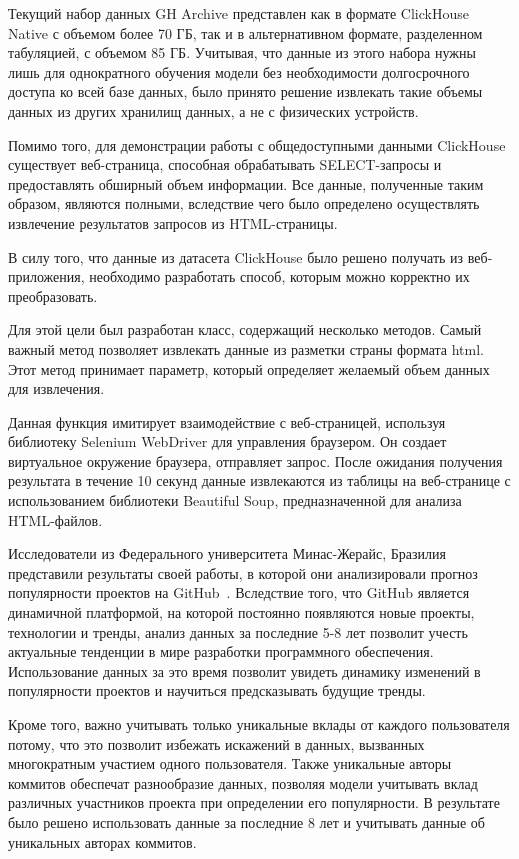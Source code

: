 Текущий набор данных GH Archive представлен как в формате ClickHouse Native с объемом более 70 ГБ, так и в альтернативном формате, разделенном табуляцией, с объемом 85 ГБ. Учитывая, что данные из этого набора нужны лишь для однократного обучения модели без необходимости долгосрочного доступа ко всей базе данных, было принято решение извлекать такие объемы данных из других хранилищ данных, а не с физических устройств.

Помимо того, для демонстрации работы с общедоступными данными ClickHouse существует веб-страница, способная обрабатывать SELECT-запросы и предоставлять обширный объем информации. Все данные, полученные таким образом, являются полными, вследствие чего было определено осуществлять извлечение результатов запросов из HTML-страницы.

В силу того, что данные из датасета ClickHouse было решено получать из веб-приложения, необходимо разработать способ, которым можно корректно их преобразовать.

Для этой цели был разработан класс, содержащий несколько методов. Самый важный метод позволяет извлекать данные из разметки страны формата html. Этот метод принимает параметр, который определяет желаемый объем данных для извлечения. 

Данная функция имитирует взаимодействие с веб-страницей, используя библиотеку Selenium WebDriver для управления браузером. Он создает виртуальное окружение браузера, отправляет запрос. После ожидания получения результата в течение 10 секунд данные извлекаются из таблицы на веб-странице с использованием библиотеки Beautiful Soup, предназначенной для анализа HTML-файлов. 

Исследователи из Федерального университета Минас-Жерайс, Бразилия представили результаты своей работы, в которой они анализировали прогноз популярности проектов на GitHub~\cite{BorgesHV16}. Вследствие того, что GitHub является динамичной платформой, на которой постоянно появляются новые проекты, технологии и тренды, анализ данных за последние 5-8 лет позволит  учесть актуальные тенденции в мире разработки программного обеспечения. Использование данных за это время позволит увидеть динамику изменений в популярности проектов и научиться предсказывать будущие тренды. 

Кроме того, важно учитывать только уникальные вклады от каждого пользователя потому, что это позволит избежать искажений в данных, вызванных многократным участием одного пользователя. Также уникальные авторы коммитов обеспечат разнообразие данных, позволяя модели учитывать вклад различных участников проекта при определении его популярности. В результате было решено использовать данные за последние 8 лет и учитывать данные об уникальных авторах коммитов.

